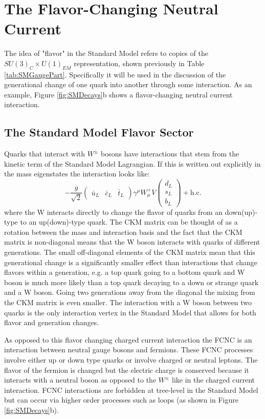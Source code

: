 
\section{The Flavor-Changing Neutral Current}
\label{sec:FCNC}
  The idea of "flavor" in the Standard Model refers to copies of the $SU(3)_C \times U(1)_{EM}$ representation, shown previously in Table \ref{tab:SMGaugePart}.  Specifically it will be used in the discussion of the generational change of one quark into another through some interaction.  As an example, Figure \ref{fig:SMDecays}b shows a flavor-changing neutral current interaction.
\subsection{The Standard Model Flavor Sector}
Quarks that interact with $W^\pm$ bosons have interactions that stem from the kinetic term of the Standard Model Lagrangian.  If this is written out explicitly in the mass eigenstates the interaction looks like:
\[ -\frac{g}{\sqrt{2}}\begin{pmatrix} \bar{u}_L & \bar{c}_L &\bar{t}_L \end{pmatrix} \gamma^\mu W_\mu^+ V\begin{pmatrix} d_L\\s_L\\b_L\end{pmatrix}+\text{h.c.}
\]
where the W interacts directly to change the flavor of quarks from an down(up)-type to an up(down)-type quark.  The CKM matrix can be thought of as a rotation between the mass and interaction basis and the fact that the CKM matrix is non-diagonal means that the W boson interacts with quarks of different generations.  The small off-diagonal elements of the CKM matrix mean that this generational change is a significantly smaller effect than interactions that change flavors within a generation, e.g. a top quark going to a bottom quark and W boson is much more likely than a top quark decaying to a down or strange quark and a W boson.  Going two generations away from the diagonal the mixing from the CKM matrix is even smaller.  The interaction with a W boson between two quarks is the only interaction vertex in the Standard Model that allows for both flavor and generation changes.

As opposed to this flavor changing charged current interaction the FCNC is an interaction between neutral gauge bosons and fermions.  These FCNC processes involve either up or down type quarks or involve charged or neutral leptons.  The flavor of the fermion is changed but the electric charge is conserved because it interacts with a neutral boson as opposed to the $W^\pm$ like in the charged current interaction.  FCNC interactions are forbidden at tree-level in the Standard Model but can occur via higher order processes such as loops (as shown in Figure \ref{fig:SMDecays}b).

